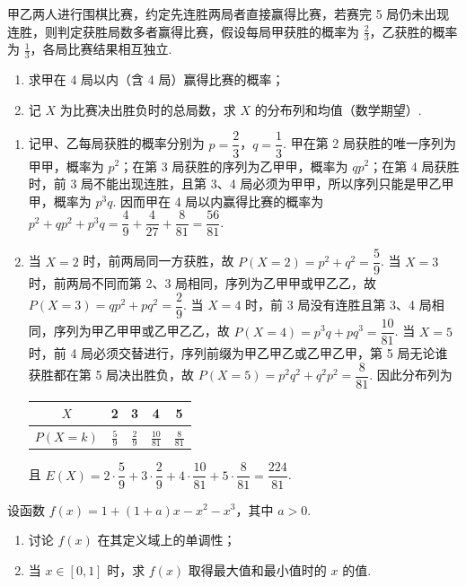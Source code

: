 \begin{problem}
甲乙两人进行围棋比赛，约定先连胜两局者直接赢得比赛，若赛完 5 局仍未出现连胜，则判定获胜局数多者赢得比赛，假设每局甲获胜的概率为 \(\frac{2}{3}\)，乙获胜的概率为 \(\frac{1}{3}\)，各局比赛结果相互独立.

\begin{enumerate}
\item 求甲在 4 局以内（含 4 局）赢得比赛的概率；
\item 记 \(X\) 为比赛决出胜负时的总局数，求 \(X\) 的分布列和均值（数学期望）.
\end{enumerate}
\end{problem}

\begin{solution}
\begin{enumerate}
\item 记甲、乙每局获胜的概率分别为 \(p=\dfrac{2}{3}\)，\(q=\dfrac{1}{3}\). 甲在第 2 局获胜的唯一序列为甲甲，概率为 \(p^{2}\)；在第 3 局获胜的序列为乙甲甲，概率为 \(qp^{2}\)；在第 4 局获胜时，前 3 局不能出现连胜，且第 3、4 局必须为甲甲，所以序列只能是甲乙甲甲，概率为 \(p^{3}q\). 因而甲在 4 局以内赢得比赛的概率为 \(p^{2}+qp^{2}+p^{3}q=\dfrac{4}{9}+\dfrac{4}{27}+\dfrac{8}{81}=\dfrac{56}{81}\).
\item 当 \(X=2\) 时，前两局同一方获胜，故 \(P(X=2)=p^{2}+q^{2}=\dfrac{5}{9}\). 当 \(X=3\) 时，前两局不同而第 2、3 局相同，序列为乙甲甲或甲乙乙，故 \(P(X=3)=qp^{2}+pq^{2}=\dfrac{2}{9}\). 当 \(X=4\) 时，前 3 局没有连胜且第 3、4 局相同，序列为甲乙甲甲或乙甲乙乙，故 \(P(X=4)=p^{3}q+pq^{3}=\dfrac{10}{81}\). 当 \(X=5\) 时，前 4 局必须交替进行，序列前缀为甲乙甲乙或乙甲乙甲，第 5 局无论谁获胜都在第 5 局决出胜负，故 \(P(X=5)=p^{2}q^{2}+q^{2}p^{2}=\dfrac{8}{81}\). 因此分布列为
\begin{center}
\begin{tabular}{c|cccc}
\(X\) & 2 & 3 & 4 & 5 \\ \hline
\(P(X=k)\) & \(\frac{5}{9}\) & \(\frac{2}{9}\) & \(\frac{10}{81}\) & \(\frac{8}{81}\)
\end{tabular}
\end{center}
且 \(E(X)=2\cdot\dfrac{5}{9}+3\cdot\dfrac{2}{9}+4\cdot\dfrac{10}{81}+5\cdot\dfrac{8}{81}=\dfrac{224}{81}\).
\end{enumerate}
\end{solution}

\begin{problem}
设函数 \( f(x) = 1 + (1 + a)x - x^2 - x^3 \)，其中 \( a > 0 \).

\begin{enumerate}
\item 讨论 \(f(x)\) 在其定义域上的单调性；
\item 当 \(x \in [0,1]\) 时，求 \(f(x)\) 取得最大值和最小值时的 \(x\) 的值.
\end{enumerate}
\end{problem}

